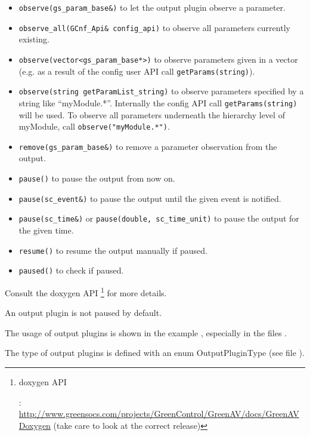 \begin{itemize}
  \item \lstinline|observe(gs_param_base&)| to let the output plugin observe a parameter.
  \item \lstinline|observe_all(GCnf_Api& config_api)| to observe all parameters currently existing.
  \item \lstinline|observe(vector<gs_param_base*>)| to observe parameters given in a vector (e.g. as a result of the config user API call \lstinline|getParams(string)|).
  \item \lstinline|observe(string getParamList_string)| to observe parameters specified by a string like \mbox{``\sffamily myModule.*}''. Internally the config API call \lstinline|getParams(string)| will be used. To observe all parameters underneath the hierarchy level of {\sffamily myModule}, call \lstinline|observe("myModule.*")|.
  \item \lstinline|remove(gs_param_base&)| to remove a parameter observation from the output.
  \item \lstinline|pause()| to pause the output from now on.
  \item \lstinline|pause(sc_event&)| to pause the output until the given event is notified.
  \item \lstinline|pause(sc_time&)| or \lstinline[language=TeX]|pause(double, sc_time_unit)| to pause the output for the given time.
  \item \lstinline|resume()| to resume the output manually if paused.
  \item \lstinline|paused()| to check if paused.
\end{itemize}

Consult the doxygen API \footnote{\hypertarget{GAVDoxygenRef08target}{\GreenAV doxygen API}: \url{http://www.greensocs.com/projects/GreenControl/GreenAV/docs/GreenAVDoxygen} (take care to look at the correct release)} for more details.

An output plugin is not paused by default.

The usage of output plugins is shown in the example , especially in the files .

The type of output plugins is defined with an enum {\sffamily OutputPluginType} (see file \mbox{).}

